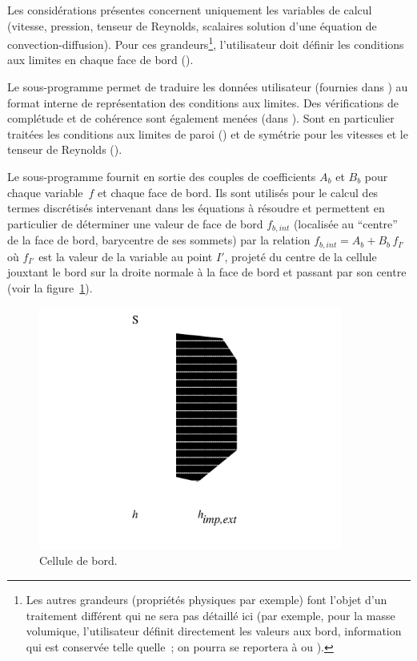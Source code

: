 Les consid\'erations pr\'esentes concernent uniquement les variables de calcul
(vitesse, pression, tenseur de Reynolds, scalaires solution d'une \'equation
de convection-diffusion). Pour ces grandeurs\footnote{
Les autres grandeurs
(propri\'et\'es physiques par
exemple) font l'objet d'un traitement diff\'erent qui ne sera pas d\'etaill\'e
ici (par exemple, pour la masse volumique, l'utilisateur d\'efinit directement
les valeurs aux bord, information qui est conserv\'ee telle quelle~; on pourra
se reportera \`a  ou ).
},
l'utilisateur doit d\'efinir
les conditions aux limites en chaque face de bord ().


Le sous-programme  permet de traduire les donn\'ees utilisateur
(fournies dans ) au format interne de repr\'esentation des conditions
aux limites. Des v\'erifications de compl\'etude et de coh\'erence sont
\'egalement men\'ees (dans ). Sont en particulier trait\'ees les conditions aux limites
de paroi ()
et de sym\'etrie pour les vitesses et le tenseur de Reynolds ().

Le sous-programme  fournit en sortie des couples de coefficients
$A_b$ et $B_b$
pour chaque variable~$f$ et chaque face  de bord. Ils sont utilis\'es pour le calcul des
termes discr\'etis\'es intervenant dans les \'equations \`a r\'esoudre et
permettent en particulier de d\'eterminer une valeur de face
de bord $f_{b,int}$ (localis\'ee au ``centre'' de la face de bord,
barycentre de ses sommets) par la
relation $f_{b,int} = A_b+B_b\,f_{I'}$ o\`u $f_{I'}$ est la valeur de
la variable au point
$I'$, projet\'e du centre de la cellule jouxtant le bord sur la droite
normale \`a
la face de bord et passant par son centre
(voir la figure~\ref{Base_Condli_fig_flux_condli}).

\begin{figure}[h]
\centerline{\includegraphics[height=8cm]{../Base/Condli/Images/fluxbord.pdf}}
\caption{\label{Base_Condli_fig_flux_condli}Cellule de bord.}
\end{figure}

